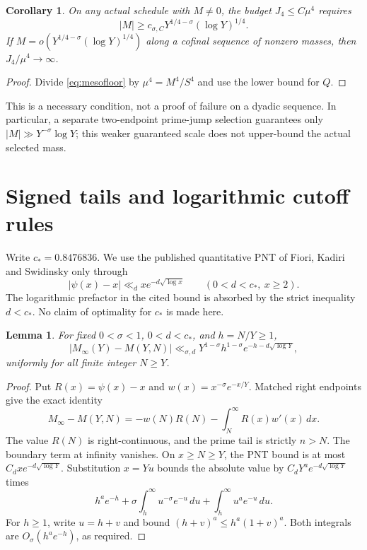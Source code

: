 \documentclass[11pt,a4paper]{article}
\newtheorem{lemma}[theorem]{Lemma}
\newtheorem{corollary}[theorem]{Corollary}
\theoremstyle{definition}
\theoremstyle{remark}
\newcommand{\dd}{\,d}
\begin{document}
\begin{corollary}\label{cor:massfloor}
On any actual schedule with \(M\ne0\), the budget \(J_4\le C\mu^4\)
requires
\[
 |M|\ge c_{\sigma,C}Y^{1/4-\sigma}(\log Y)^{1/4}.
\]
If \(M=o(Y^{1/4-\sigma}(\log Y)^{1/4})\) along a cofinal sequence
of nonzero masses, then \(J_4/\mu^4\to\infty\).
\end{corollary}
\begin{proof}
Divide \eqref{eq:mesofloor} by \(\mu^4=M^4/S^4\) and use the
lower bound for \(Q\).
\end{proof}

This is a necessary condition, not a proof of failure on a dyadic
sequence. In particular, a separate two-endpoint prime-jump
selection guarantees only \(|M|\gg Y^{-\sigma}\log Y\);
this weaker guaranteed scale does not upper-bound the actual
selected mass.

\section{Signed tails and logarithmic cutoff rules}

Write \(c_*=0.8476836\). We use the published quantitative PNT of
Fiori, Kadiri and Swidinsky \cite[Corollary 1.4]{FKS} only through
\[
 |\psi(x)-x|\ll_d x e^{-d\sqrt{\log x}}
 \qquad(0<d<c_*,\ x\ge2).
\]
The logarithmic prefactor in the cited bound is absorbed by the
strict inequality \(d<c_*\). No claim of optimality for \(c_*\)
is made here.

\begin{lemma}\label{lem:signedtail}
For fixed \(0<\sigma<1\), \(0<d<c_*\), and \(h=N/Y\ge1\),
\[
 |M_\infty(Y)-M(Y,N)|
 \ll_{\sigma,d}Y^{1-\sigma}h^{1-\sigma}
                   e^{-h-d\sqrt{\log Y}},
\]
uniformly for all finite integer \(N\ge Y\).
\end{lemma}
\begin{proof}
Put \(R(x)=\psi(x)-x\) and \(w(x)=x^{-\sigma}e^{-x/Y}\).
Matched right endpoints give the exact identity
\[
 M_\infty-M(Y,N)
 =-w(N)R(N)-\int_N^\infty R(x)w'(x)\dd x.
\]
The value \(R(N)\) is right-continuous, and the prime tail is
strictly \(n>N\). The boundary term at infinity vanishes.
On \(x\ge N\ge Y\), the PNT bound is at most
\(C_dx e^{-d\sqrt{\log Y}}\). Substitution \(x=Yu\) bounds the
absolute value by \(C_dY^a e^{-d\sqrt{\log Y}}\) times
\[
 h^ae^{-h}+\sigma\int_h^\infty u^{-\sigma}e^{-u}\dd u
                 +\int_h^\infty u^ae^{-u}\dd u.
\]
For \(h\ge1\), write \(u=h+v\) and bound
\((h+v)^a\le h^a(1+v)^a\). Both integrals are
\(O_\sigma(h^ae^{-h})\), as required.
\end{proof}
\end{document}
